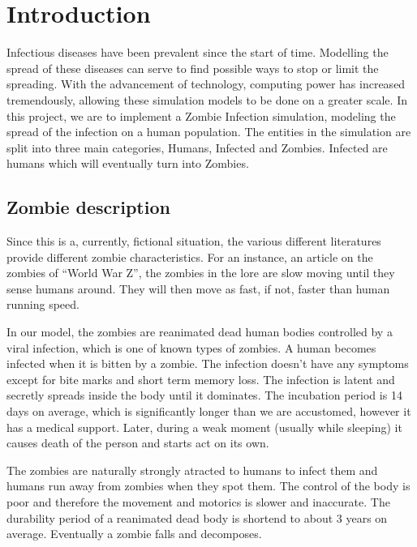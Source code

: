 \documentclass[a4paper]{article}
\title{\mytitle}
\author{Adam Juraszek \and Ryan Leong Wei Shiong \and Matthew Signorini \and Ziying Yang}
\begin{document}
\maketitle

\section{Introduction} %

Infectious diseases have been prevalent since the start of time.
Modelling the spread of these diseases can serve to find possible ways to stop or limit the spreading.
With the advancement of technology, computing power has increased tremendously, allowing these simulation models to be done on a greater scale.
In this project, we are to implement a Zombie Infection simulation, modeling the spread of the infection on a human population.
The entities in the simulation are split into three main categories, Humans, Infected and Zombies.
Infected are humans which will eventually turn into Zombies.

\subsection{Zombie description}

Since this is a, currently, fictional situation, the various different literatures provide different zombie characteristics.
For an instance, an article on the zombies of ``World War Z'', the zombies in the lore are slow moving until they sense humans around.
They will then move as fast, if not, faster than human running speed. \cite{guidetozombies}

In our model, the zombies are reanimated dead human bodies controlled by a viral infection, which is one of known types of zombies. \cite{survivingthedead}
A human becomes infected when it is bitten by a zombie.
The infection doesn't have any symptoms except for bite marks and short term memory loss.
The infection is latent and secretly spreads inside the body until it dominates.
The incubation period is 14 days on average, which is significantly longer than we are accustomed, however it has a medical support. \cite{mogk2011everything}
Later, during a weak moment (usually while sleeping) it causes death of the person and starts act on its own.

The zombies are naturally strongly atracted to humans to infect them and humans run away from zombies when they spot them.
The control of the body is poor and therefore the movement and motorics is slower and inaccurate.
The durability period of a reanimated dead body is shortend to about 3 years on average. \cite{zombiepedia}
Eventually a zombie falls and decomposes.
\end{document}
